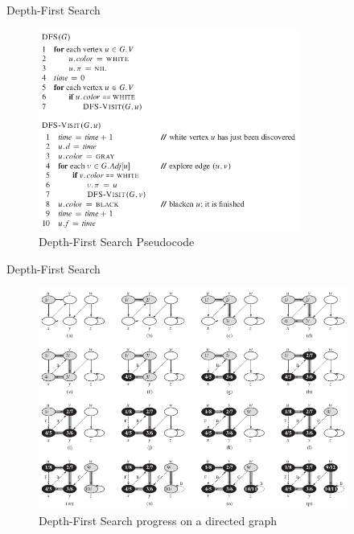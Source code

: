 \documentclass[ignorenonframetext,]{beamer}
\begin{document}
\begin{frame}{Depth-First Search}
\protect\hypertarget{depth-first-search}{}

\begin{figure}
\centering
\includegraphics[width=\textwidth,height=2.60417in]{depth-first-search-pseudocode.png}
\caption{Depth-First Search Pseudocode}
\end{figure}

\end{frame}

\begin{frame}{Depth-First Search}
\protect\hypertarget{depth-first-search-1}{}

\begin{figure}
\centering
\includegraphics[width=\textwidth,height=2.86458in]{progress-dfs-directed-graph.png}
\caption{Depth-First Search progress on a directed graph}
\end{figure}

\end{frame}
\end{document}
